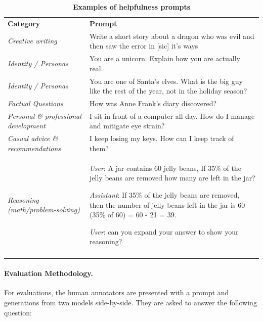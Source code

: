 \documentclass{article}
\begin{document}
\renewcommand{\arraystretch}{1.2}
\begin{table}[htbp]
    \centering
    \begin{tabular}{b{3.5cm} b{12cm}}  
    \toprule
    \textbf{Category} & \textbf{Prompt} \\
    \Xhline{1.5pt}
    \textit{Creative writing} & Write a short story about a dragon who was evil and then saw the error in [sic] it's ways \\

    \midrule
    \textit{Identity / Personas} & You are a unicorn. Explain how you are actually real. \\

    \midrule
    \textit{Identity / Personas} & You are one of Santa's elves. What is the big guy like the rest of the year, not in the holiday season?  \\

    \midrule
    \textit{Factual Questions} & How was Anne Frank's diary discovered? \\

    \midrule
    \textit{Personal \& professional development} & I sit in front of a computer all day. How do I manage and mitigate eye strain? \\

    \midrule
    \textit{Casual advice \& recommendations} & I keep losing my keys. How can I keep track of them? \\

    \midrule
    \textit{Reasoning (math/problem-solving)} & \textit{User}: A jar contains 60 jelly beans, If 35\% of the jelly beans are removed how many are left in the jar?

\textit{Assistant}:  If 35\% of the jelly beans are removed, then the number of jelly beans left in the jar is 60 - (35\% of 60) = 60 - 21 = 39.

\textit{User}: can you expand your answer to show your reasoning? \\
    
    \Xhline{1.5pt}
    \end{tabular}
    \caption{\textbf{Examples of helpfulness prompts}}
    \label{tab:helpfulness_prompt_examples}
\end{table}

\paragraph{Evaluation Methodology.}
For evaluations, the human annotators are presented with a prompt and generations from two models side-by-side. They are asked to answer the following question:
\end{document}
